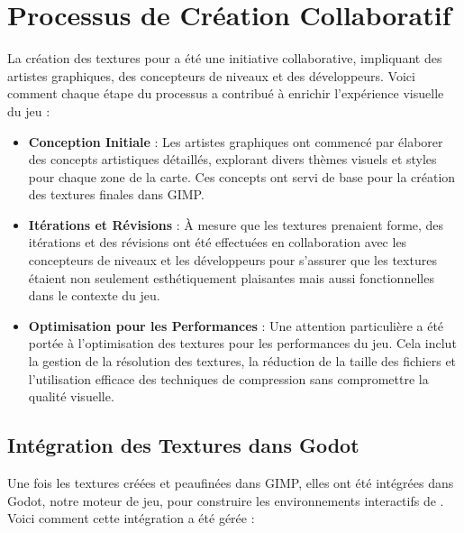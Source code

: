 \section*{Processus de Création Collaboratif}

La création des textures pour \gameName a été une initiative collaborative, impliquant des artistes graphiques, 
des concepteurs de niveaux et des développeurs. Voici comment chaque étape du processus a contribué à enrichir l'expérience visuelle du jeu :
\\

\begin{itemize}
    \item \textbf{Conception Initiale} : Les artistes graphiques ont commencé par élaborer des concepts artistiques détaillés, explorant divers thèmes visuels et styles pour chaque zone de la carte. Ces concepts ont servi de base pour la création des textures finales dans GIMP.
    \\

    \item \textbf{Itérations et Révisions} : À mesure que les textures prenaient forme, des itérations et des révisions ont été effectuées en collaboration avec les concepteurs de niveaux et les développeurs pour s'assurer que les textures étaient non seulement esthétiquement plaisantes mais aussi fonctionnelles dans le contexte du jeu.
    \\

    \item \textbf{Optimisation pour les Performances} : Une attention particulière a été portée à l'optimisation des textures pour les performances du jeu. Cela inclut la gestion de la résolution des textures, la réduction de la taille des fichiers et l'utilisation efficace des techniques de compression sans compromettre la qualité visuelle.
\end{itemize}

\subsection*{Intégration des Textures dans Godot}

Une fois les textures créées et peaufinées dans GIMP, elles ont été intégrées dans Godot, notre moteur de jeu,
 pour construire les environnements interactifs de \gameName. Voici comment cette intégration a été gérée :
\\

